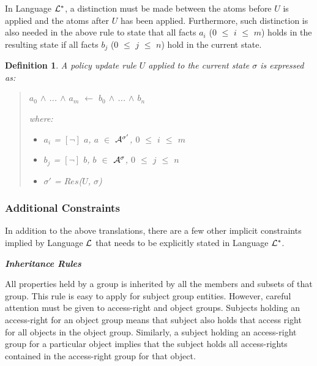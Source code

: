 \documentclass[10pt, twocolumn]{article}
\newtheorem{definition}{Definition}
\begin{document}
          In Language ${\cal L}^{*}$, a distinction must be made between the
          atoms before $U$ is applied and the atoms after $U$ has been applied.
          Furthermore, such distinction is also needed in the above rule to
          state that all facts $a_{i}$ ($0$ $\leq$ $i$ $\leq$ $m$) holds in
          the resulting state if all facts $b_{j}$ ($0$ $\leq$ $j$ $\leq$ $n$)
          hold in the current state.

          \begin{definition}
            A policy update rule $U$ applied to the current state $\sigma$ is
            expressed as:

            \begin{quote}
              $a_{0}$ $\land$ ... $\land$ $a_{m}$ $\leftarrow$ $b_{0}$ $\land$ ... $\land$ $b_{n}$

              where:

              \begin{itemize}
                \item
                  $a_{i}$ = $[\lnot]$ $a$, $a$ $\in$ ${\cal A}^{\sigma'}$, $0$ $\leq$ $i$ $\leq$ $m$
                \item
                  $b_{j}$ = $[\lnot]$ $b$, $b$ $\in$ ${\cal A}^{\sigma}$, $0$ $\leq$ $j$ $\leq$ $n$
                \item
                  $\sigma'$ = $Res$($U$, $\sigma$)
              \end{itemize}
            \end{quote}
          \end{definition}

      \subsubsection{Additional Constraints}

        In addition to the above translations, there are a few other implicit
        constraints implied by Language ${\cal L}$ that needs to be explicitly
        stated in Language ${\cal L}^{*}$.

        \noindent \textbf{\emph{Inheritance Rules}}

          All properties held by a group is inherited by all the members and
          subsets of that group. This rule is easy to apply for subject group
          entities. However, careful attention must be given to access-right
          and object groups. Subjects holding an access-right for an object
          group means that subject also holds that access right for all objects
          in the object group. Similarly, a subject holding an access-right
          group for a particular object implies that the subject holds
          all access-rights contained in the access-right group for that
          object.
\end{document}
